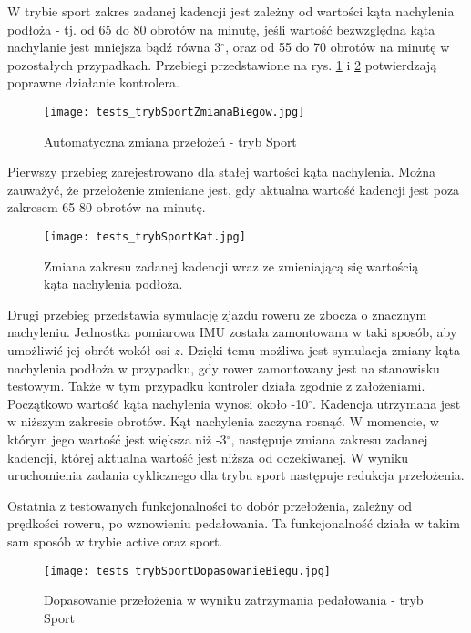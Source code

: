 W trybie sport zakres zadanej kadencji jest zależny od wartości kąta nachylenia podłoża - tj. od 65 do 80 obrotów na minutę, jeśli wartość bezwzględna kąta nachylanie jest mniejsza bądź równa 3$^{\circ}$, oraz od 55 do 70 obrotów na minutę w pozostałych przypadkach. Przebiegi przedstawione na rys.  \ref{fig:tests_sportModeZmiana1} i \ref{fig:tests_sportModeZmiana2} potwierdzają poprawne działanie kontrolera.
\begin{figure}[h]
    \centering
    \texttt{[image: tests\_trybSportZmianaBiegow.jpg]}
    \caption{Automatyczna zmiana przełożeń - tryb Sport}
    \label{fig:tests_sportModeZmiana1}
\end{figure}
Pierwszy przebieg zarejestrowano dla stałej wartości kąta nachylenia. Można zauważyć, że przełożenie zmieniane jest, gdy aktualna wartość kadencji jest poza zakresem 65-80 obrotów na minutę. 
\begin{figure}[h]
    \centering
    \texttt{[image: tests\_trybSportKat.jpg]}
    \caption{Zmiana zakresu zadanej kadencji wraz ze zmieniającą się wartością kąta nachylenia podłoża.}
    \label{fig:tests_sportModeZmiana2}
\end{figure}

Drugi przebieg przedstawia symulację zjazdu roweru ze zbocza o znacznym nachyleniu. Jednostka pomiarowa IMU została zamontowana w taki sposób, aby umożliwić jej obrót wokół osi $z$. Dzięki temu możliwa jest symulacja zmiany kąta nachylenia podłoża w przypadku, gdy rower zamontowany jest na stanowisku testowym. Także w tym przypadku kontroler działa zgodnie z założeniami. Początkowo wartość kąta nachylenia wynosi około -10$^{\circ}$. Kadencja utrzymana jest w niższym zakresie obrotów. Kąt nachylenia zaczyna rosnąć. W momencie, w którym jego wartość jest większa niż -3$^{\circ}$, następuje zmiana zakresu zadanej kadencji, której aktualna wartość jest niższa od oczekiwanej. W wyniku uruchomienia zadania cyklicznego dla trybu sport następuje redukcja przełożenia.

Ostatnia z testowanych funkcjonalności to dobór przełożenia, zależny od prędkości roweru, po wznowieniu pedałowania. Ta funkcjonalność działa w takim sam sposób w trybie active oraz sport.
\begin{figure}[h]
    \centering
    \texttt{[image: tests\_trybSportDopasowanieBiegu.jpg]}
    \caption{Dopasowanie przełożenia w wyniku zatrzymania pedałowania - tryb Sport}
    \label{fig:tests_gearSpeedSelection}
\end{figure}

